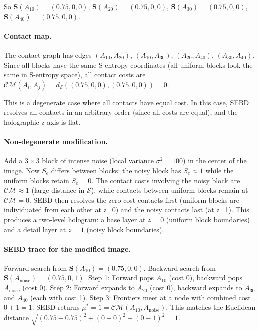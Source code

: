 \documentclass[twocolumn]{article}
\theoremstyle{plain}
\theoremstyle{definition}
\newcommand{\CM}{\mathcal{CM}}
\newcommand{\ScS}{\mathcal{S}}
\newcommand{\Se}{S_e}
\newcommand{\bS}{\mathbf{S}}
\newcommand{\dS}{d_{\mathcal{S}}}
\begin{document}
So $\bS(A_{10}) = (0.75, 0, 0)$, $\bS(A_{20}) = (0.75, 0, 0)$, $\bS(A_{30}) =
(0.75, 0, 0)$, $\bS(A_{40}) = (0.75, 0, 0)$.

\paragraph{Contact map.} The contact graph has edges $(A_{10}, A_{20})$,
$(A_{10}, A_{30})$, $(A_{20}, A_{40})$, $(A_{30}, A_{40})$. Since all blocks
have the same S-entropy coordinates (all uniform blocks look the same in S-entropy
space), all contact costs are $\CM(A_i, A_j) = \dS((0.75,0,0),(0.75,0,0)) = 0$.

This is a degenerate case where all contacts have equal cost. In this case, SEBD
resolves all contacts in an arbitrary order (since all costs are equal), and
the holographic z-axis is flat.

\paragraph{Non-degenerate modification.} Add a $3\times 3$ block of intense
noise (local variance $\sigma^2 = 100$) in the center of the image. Now $\Se$
differs between blocks: the noisy block has $\Se \approx 1$ while the uniform
blocks retain $\Se = 0$. The contact costs involving the noisy block are
$\CM \approx 1$ (large distance in $\ScS$), while contacts between uniform blocks
remain at $\CM = 0$. SEBD then resolves the zero-cost contacts first (uniform
blocks are individuated from each other at z=0) and the noisy contacts last (at
z=1). This produces a two-level hologram: a base layer at $z=0$ (uniform block
boundaries) and a detail layer at $z=1$ (noisy block boundaries).

\paragraph{SEBD trace for the modified image.} Forward search from $\bS(A_{10})
= (0.75, 0, 0)$. Backward search from $\bS(A_{\text{noise}}) = (0.75, 0, 1)$.
Step 1: Forward pops $A_{10}$ (cost 0), backward pops $A_{\text{noise}}$ (cost 0).
Step 2: Forward expands to $A_{20}$ (cost 0), backward expands to $A_{30}$ and
$A_{40}$ (each with cost 1). Step 3: Frontiers meet at a node with combined cost
$0 + 1 = 1$. SEBD returns $\mu^* = 1 = \CM(A_{10}, A_{\text{noise}})$. This
matches the Euclidean distance $\sqrt{(0.75-0.75)^2 + (0-0)^2 + (0-1)^2} = 1$.
\end{document}
